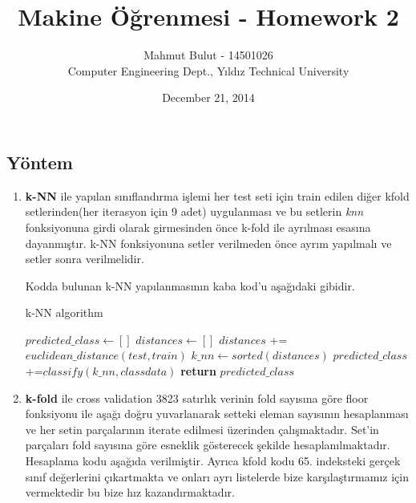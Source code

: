 \documentclass[11pt]{article}
\begin{document}
\title{ Makine Öğrenmesi - Homework 2 }
\date{December 21, 2014}
\author{Mahmut Bulut - 14501026\\ Computer Engineering Dept., Yıldız Technical University}

\maketitle

\subsection*{Yöntem}
\begin{enumerate}[\indent a)]

\item
\textbf{k-NN} ile yapılan sınıflandırma işlemi her test seti için train edilen diğer kfold setlerinden(her iterasyon için 9 adet) uygulanması ve bu setlerin \textit{knn} fonksiyonuna girdi olarak girmesinden önce k-fold ile ayrılması esasına dayanmıştır.
k-NN fonksiyonuna setler verilmeden önce ayrım yapılmalı ve setler sonra verilmelidir.

Kodda bulunan k-NN yapılanmasının kaba kod'u aşağıdaki gibidir.
\begin{algorithm}
  \caption{k-NN algorithm}\label{k-NN}
  \begin{algorithmic}[1]
      \State $predicted\_class\gets []$
       
        \State $distances \gets []$
            \State $distances$ += $euclidean\_distance(test, train)$ 
        \EndFor\label{trainingsetfor}
        \State $k\_nn \gets sorted(distances)$ 
        \State $predicted\_class$+=$classify(k\_nn, classdata)$ 
      \EndFor\label{testsetfor}
      \State \textbf{return} $predicted\_class$
    \EndProcedure
  \end{algorithmic}
\end{algorithm}

\item
\textbf{k-fold} ile cross validation 3823 satırlık verinin fold sayısına göre floor fonksiyonu ile aşağı doğru yuvarlanarak setteki eleman sayısının hesaplanması ve her setin parçalarının iterate edilmesi üzerinden çalışmaktadır. Set'in parçaları fold sayısına göre esneklik gösterecek şekilde hesaplanılmaktadır. Hesaplama kodu aşağıda verilmiştir. Ayrıca kfold kodu 65. indeksteki gerçek sınıf değerlerini çıkartmakta ve onları ayrı listelerde bize karşılaştırmamız için vermektedir bu bize hız kazandırmaktadır.


\end{enumerate}
\end{document}
